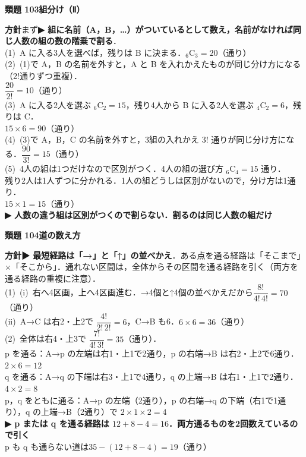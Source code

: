 \documentclass[a4paper,11pt]{ltjsarticle}
\newcommand{\ans}[2]{\Needspace{5\baselineskip}\vspace{6pt}%
  {\sffamily\bfseries 類題 #1\quad #2}\par}
\newcommand{\point}[1]{\textsf{\bfseries ▶ #1}}
\begin{document}
\ans{103}{組分け（Ⅱ）}
\begin{kai}
\textbf{方針}\quad まず\point{組に名前（A，B，…）がついているとして数え，名前がなければ同じ人数の組の数の階乗で割る}．\\[2pt]
(1)\ A に入る3人を選べば，残りは B に決まる．\quad ${}_6\mathrm C_3=20$（通り）\\[2pt]
(2)\ (1)で A，B の名前を外すと，A と B を入れかえたものが同じ分け方になる（2!通りずつ重複）．\\
\hspace*{1.5em}$\dfrac{20}{2!}=10$（通り）\\[2pt]
(3)\ A に入る2人を選ぶ ${}_6\mathrm C_2=15$，残り4人から B に入る2人を選ぶ ${}_4\mathrm C_2=6$，残りは C．\\
\hspace*{1.5em}$15\times6=90$（通り）\\[2pt]
(4)\ (3)で A，B，C の名前を外すと，3組の入れかえ $3!$ 通りが同じ分け方になる．\quad $\dfrac{90}{3!}=15$（通り）\\[2pt]
(5)\ 4人の組は1つだけなので区別がつく．4人の組の選び方 ${}_6\mathrm C_4=15$ 通り．\\
\hspace*{1.5em}残り2人は1人ずつに分かれる．1人の組どうしは区別がないので，分け方は1通り．\\
\hspace*{1.5em}$15\times1=15$（通り）\\
\hspace*{1.5em}\point{人数の違う組は区別がつくので割らない．割るのは同じ人数の組だけ}
\end{kai}

\ans{104}{道の数え方}
\begin{kai}
\textbf{方針}\quad \point{最短経路は「→」と「↑」の並べかえ}．ある点を通る経路は「そこまで」×「そこから」．通れない区間は，全体からその区間を通る経路を引く（両方を通る経路の重複に注意）．\\[2pt]
(1)\ (i)\ 右へ4区画，上へ4区画進む．→4個と↑4個の並べかえだから\quad $\dfrac{8!}{4!\,4!}=70$（通り）\\[2pt]
\hspace*{1.5em}(ii)\ A→C は右2・上2で $\dfrac{4!}{2!\,2!}=6$，C→B も6．\quad $6\times6=36$（通り）\\[2pt]
(2)\ 全体は右4・上3で $\dfrac{7!}{4!\,3!}=35$（通り）．\\
\hspace*{1.5em}p を通る：A→p の左端は右1・上1で2通り，p の右端→B は右2・上2で6通り．$2\times6=12$\\
\hspace*{1.5em}q を通る：A→q の下端は右3・上1で4通り，q の上端→B は右1・上1で2通り．$4\times2=8$\\
\hspace*{1.5em}p，q をともに通る：A→p の左端（2通り），p の右端→q の下端（右1で1通り），q の上端→B（2通り）で $2\times1\times2=4$\\
\hspace*{1.5em}\point{p または q を通る経路は $12+8-4=16$．両方通るものを2回数えているので引く}\\
\hspace*{1.5em}p も q も通らない道は\quad $35-(12+8-4)=19$（通り）
\end{kai}
\end{document}
